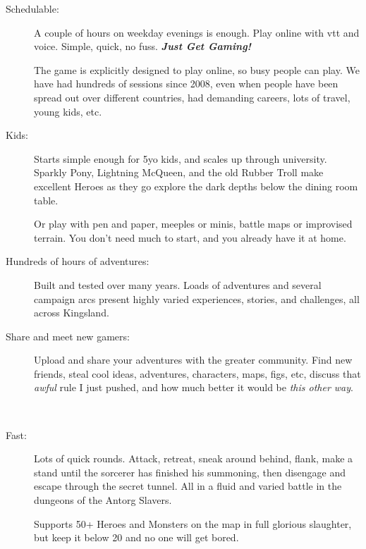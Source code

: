 \begin{description}


\item[Schedulable:] A couple of hours on weekday evenings is enough. Play online with vtt and voice. Simple, quick, no fuss. 
\textbf{\textit{Just Get Gaming!}} 

The game is explicitly designed to play online, so busy people can play. We have had hundreds of sessions since 2008, even when people have been spread out over different countries, had demanding careers, lots of travel, young kids, etc.


\item[Kids:] Starts simple enough for 5yo kids, and scales up through university. Sparkly Pony, Lightning McQueen, and the old Rubber Troll make excellent Heroes as they go explore the dark depths below the dining room table.

Or play with pen and paper, meeples or minis, battle maps or improvised terrain. You don't need much to start, and you already have it at home.


\item[Hundreds of hours of adventures:] Built and tested over many years. Loads of adventures and several campaign arcs present highly varied experiences, stories, and challenges, all across Kingsland. 


\item[Share and meet new gamers:] Upload and share your adventures with the greater community. Find new friends, steal cool ideas, adventures, characters, maps, figs, etc, discuss that \emph{awful} rule I just pushed, and how much better it would be \emph{this other way}.

\

\item[Fast:] Lots of quick rounds. Attack, retreat, sneak around behind, flank, make a stand until the sorcerer has finished his summoning, then disengage and escape through the secret tunnel. All in a fluid and varied battle in the dungeons of the Antorg Slavers.

Supports 50+ Heroes and Monsters on the map in full glorious slaughter, but keep it below 20 and no one will get bored.


\end{description}

\

